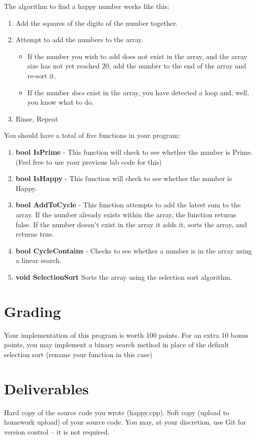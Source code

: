 \documentclass[letterpaper,12pt]{article}
\begin{document}
The algorithm to find a happy number works like this:
\begin{enumerate}
    \item Add the squares of the digits of the number together.
    \item Attempt to add the numbers to the array.
        \begin{itemize}
            \item If the number you wish to add does not exist in the array, and the array size
                has not yet reached 20, add the number to the end of the array and re-sort it.
            \item If the number \emph{does} exist in the array, you have detected a loop and, well,
                you know what to do.
        \end{itemize}
    \item Rinse, Repeat
\end{enumerate}

You should have a total of five functions in your program:
\begin{enumerate}
    \item \textbf{bool IsPrime} - This function will check to see whether the number is Prime. (Feel free to use your previous lab code for this)
    \item \textbf{bool IsHappy} - This function will check to see whether the number is Happy.
    \item \textbf{bool AddToCycle} - This function attempts to add the latest sum to the array.
       If the number already exists within the array, the function returns false.
       If the number doesn’t exist in the array it adds it, sorts the array, and returns true.
    \item \textbf{bool CycleContains} - Checks to see whether a number is in the array using a linear search.
    \item \textbf{void SelectionSort} Sorts the array using the selection sort algorithm.
\end{enumerate}

\section*{Grading}
Your implementation of this program is worth 100 points. For an extra 10 bonus points,
you may implement a binary search method in place of the default selection sort (rename your function in this case)


\section*{Deliverables}
Hard copy of the source code you wrote (happy.cpp). Soft copy (upload to homework upload) of
your source code. You may, at your discretion, use Git for version control -- it is not required.
\end{document}
